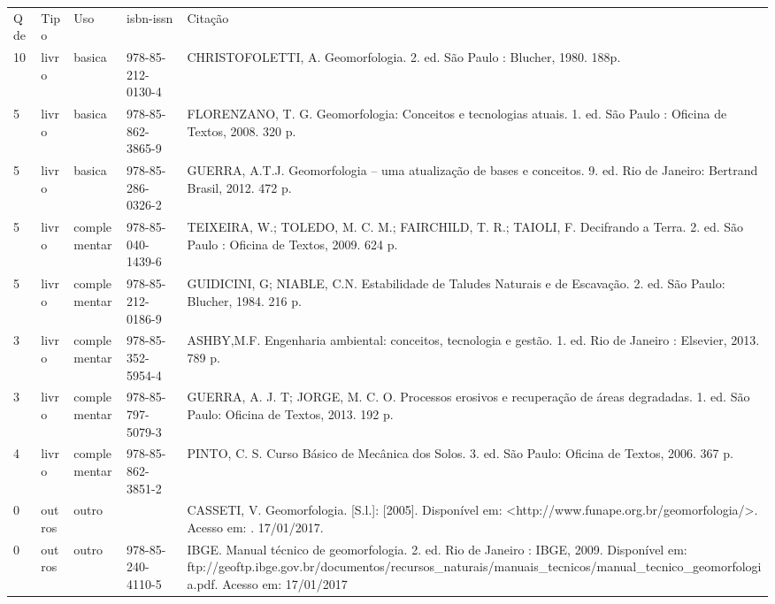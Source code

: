 \documentclass[12pt,a4paper,twoside]{report}
\begin{document}
\begin{tabular}{llllp{8cm}}
Qde & Tipo & Uso & isbn-issn & Citação \\
10&livro&basica&978-85-212-0130-4&CHRISTOFOLETTI, A. Geomorfologia. 2. ed. São Paulo : Blucher, 1980. 188p.\\
5&livro&basica&978-85-862-3865-9&FLORENZANO, T. G. Geomorfologia: Conceitos e tecnologias atuais. 1. ed. São Paulo : Oficina de Textos, 2008. 320 p.\\
5&livro&basica&978-85-286-0326-2&GUERRA, A.T.J. Geomorfologia – uma atualização de bases e conceitos. 9. ed. Rio de Janeiro: Bertrand Brasil, 2012. 472 p.\\
5&livro&complementar&978-85-040-1439-6&TEIXEIRA, W.; TOLEDO, M. C. M.; FAIRCHILD, T. R.; TAIOLI, F. Decifrando a Terra. 2. ed. São Paulo : Oficina de Textos, 2009. 624 p.\\
5&livro&complementar&978-85-212-0186-9&GUIDICINI, G; NIABLE, C.N. Estabilidade de Taludes Naturais e de Escavação. 2. ed. São Paulo: Blucher, 1984. 216 p.\\
3&livro&complementar&978-85-352-5954-4&ASHBY,M.F. Engenharia ambiental: conceitos, tecnologia e gestão. 1. ed. Rio de Janeiro : Elsevier, 2013. 789 p.\\
3&livro&complementar&978-85-797-5079-3&GUERRA, A. J. T; JORGE, M. C. O. Processos erosivos e recuperação de áreas degradadas. 1. ed. São Paulo: Oficina de Textos, 2013. 192 p.\\
4&livro&complementar&978-85-862-3851-2&PINTO, C. S. Curso Básico de Mecânica dos Solos. 3. ed. São Paulo: Oficina de Textos, 2006. 367 p.\\
0&outros&outro&&CASSETI, V. Geomorfologia. [S.l.]: [2005]. Disponível em: <http://www.funape.org.br/geomorfologia/>. Acesso em: . 17/01/2017.\\
0&outros&outro&978-85-240-4110-5&IBGE. Manual técnico de geomorfologia. 2. ed. Rio de Janeiro : IBGE, 2009. Disponível em: ftp://geoftp.ibge.gov.br/documentos/recursos_naturais/manuais_tecnicos/manual_tecnico_geomorfologia.pdf. Acesso em: 17/01/2017\\
\end{tabular}
\end{document}
